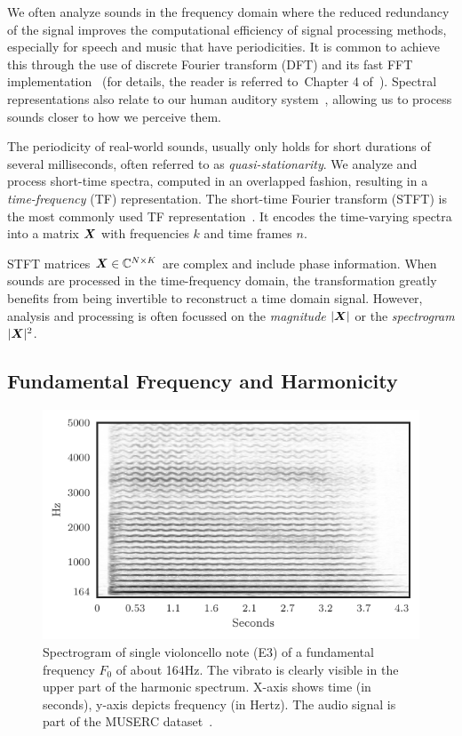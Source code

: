 We often analyze sounds in the frequency domain where the reduced redundancy of the signal improves the computational efficiency of signal processing methods, especially for speech and music that have periodicities.
It is common to achieve this through the use of discrete Fourier transform (DFT) and its fast FFT implementation~\cite{cooley65} (for details, the reader is referred to~Chapter 4 of~\cite{proakis96}).
Spectral representations also relate to our human auditory system~\cite{zwicker13, moore89}, allowing us to process sounds closer to how we perceive them.
\par
The periodicity of real-world sounds, usually only holds for short durations of several milliseconds, often referred to as \emph{quasi-stationarity}.
We analyze and process short-time spectra, computed in an overlapped fashion, resulting in a \emph{time-frequency} (TF) representation.
The short-time Fourier transform (STFT) is the most commonly used TF representation~\cite{mcaulay86}.
It encodes the time-varying spectra into a matrix \({\bm{X}}\) with frequencies \(k\) and time frames \(n\).
\par
STFT matrices \({\bm{X}} \in {\mathbb{C}}^{N \times K}\) are complex and include phase information.
When sounds are processed in the time-frequency domain, the transformation greatly benefits from being invertible to reconstruct a time domain signal.
However, analysis and processing is often focussed  on the \emph{magnitude} \(|{\bm{X}}|\) or the \emph{spectrogram} \(|{\bm{X}}|^2\).

\subsection{Fundamental Frequency and Harmonicity}

\begin{figure}[h!]
  \centering
  \includegraphics[width=0.8\columnwidth]{Chapters/02_Fundamentals/figures/cello.pdf}
  \caption{Spectrogram of single violoncello note (E3) of a fundamental frequency \(F_0\) of about 164\si{\hertz}. The vibrato is clearly visible in the upper part of the harmonic spectrum. X-axis shows time (in seconds), y-axis depicts frequency (in Hertz). The audio signal is part of the MUSERC dataset~\cite{stoeter15acm}.}%
  \label{fig:cello_example}%
\end{figure}

